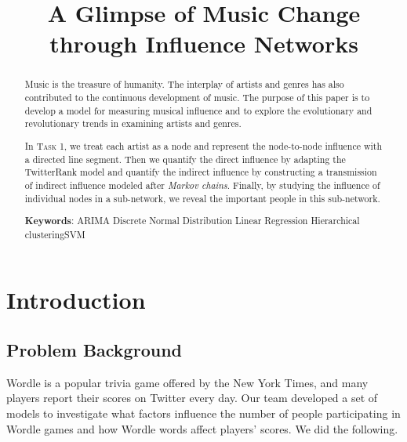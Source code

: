 \documentclass[12pt]{article}  %
\title{A Glimpse of Music Change through Influence Networks}  %
\begin{document}
\begin{abstract}
	
	Music is the treasure of humanity. The interplay of artists and genres has also contributed to the continuous development of music. The purpose of this paper is to develop a model for measuring musical influence and to explore the evolutionary and revolutionary trends in examining artists and genres.
	
	In \textsc{Task 1}, we treat each artist as a node and represent the node-to-node influence with a directed line segment. Then we quantify the direct influence by adapting the TwitterRank model and quantify the indirect influence by constructing a transmission of indirect influence modeled after \textit{Markov chains}. Finally, by studying the influence of individual nodes in a sub-network, we reveal the important people in this sub-network.
	

	
	
	
	
	
	\vspace{5pt}
	\textbf{Keywords}: ARIMA \quad Discrete Normal Distribution \quad Linear Regression \quad Hierarchical clustering\quad SVM

	
\end{abstract}
    
\maketitle  %

\tableofcontents

\section{Introduction}

\subsection{Problem Background}
Wordle is a popular trivia game offered by the New York Times, and many players report their scores on Twitter every day.
Our team developed a set of models to investigate what factors influence the number of people participating in Wordle games and how Wordle words affect players' scores. We did the following.
\end{document}
